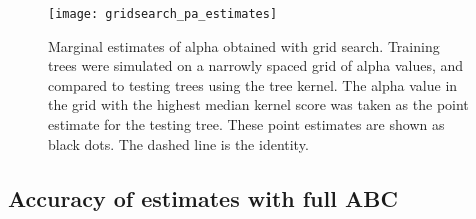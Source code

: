 \begin{figure}[ht]
  \centering
  \texttt{[image: gridsearch\_pa\_estimates]}
  \caption[Marginal estimates of \gls{alpha} obtained with grid search]{
    Marginal estimates of \gls{alpha} obtained with grid search. Training trees
    were simulated on a narrowly spaced grid of \gls{alpha} values, and
    compared to testing trees using the tree kernel. The \gls{alpha} value in
    the grid with the highest median kernel score was taken as the point
    estimate for the testing tree. These point estimates are shown as black
    dots. The dashed line is the identity.
  }
  \label{fig:gridest}
\end{figure}

\subsection{Accuracy of estimates with full ABC}
